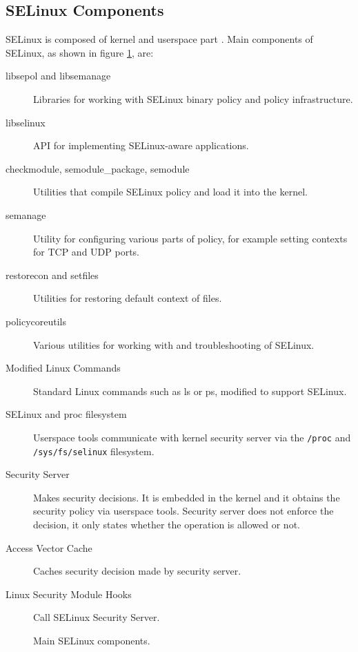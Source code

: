 \subsection{SELinux Components}
SELinux is composed of kernel and userspace part \cite[pp.~19--22]{tsn}. Main
components of SELinux, as shown in figure \ref{fig:selinuxcomponents}, are:
\begin{description}
    \item [libsepol and libsemanage] Libraries for working with SELinux binary
        policy and policy infrastructure.
    \item [libselinux] API for implementing SELinux-aware applications.
    \item [checkmodule, semodule\_package, semodule] Utilities that compile
        SELinux policy and load it into the kernel.
    \item [semanage] Utility for configuring various parts of policy, for
        example setting contexts for TCP and UDP ports.
    \item [restorecon and setfiles] Utilities for restoring default context of
        files.
    \item [policycoreutils] Various utilities for working with and
        troubleshooting of SELinux.
    \item [Modified Linux Commands] Standard Linux commands such as ls or ps,
        modified to support SELinux.
    \item [SELinux and proc filesystem] Userspace tools communicate with kernel
        security server via the \texttt{/proc} and \texttt{/sys/fs/selinux}
        filesystem.
    \item [Security Server] Makes security decisions. It is embedded in the
        kernel and it obtains the security policy via userspace tools. Security
        server does not enforce the decision, it only states whether the
        operation is allowed or not.
    \item [Access Vector Cache] Caches security decision made by security
        server.
    \item [Linux Security Module Hooks] Call SELinux Security Server.
\end{description}

\begin{figure}
    \centering
    \label{fig:selinuxcomponents}
    
    \caption{Main SELinux components.}
\end{figure}

